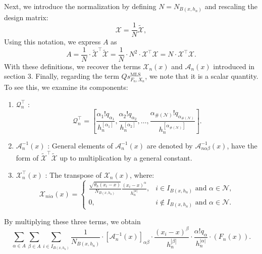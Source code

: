 \documentclass{article}
\newcommand{\mlsfunstoch}{s^\text{MLS}_{F_n,X_n}}
\begin{document}
Next, we introduce the normalization by defining $N=N_{B\left(x, h_n\right)} $ and rescaling the design matrix: 
\[
\mathscr{X} = \frac{1}{N} \tilde{\mathscr{X}},
\]
Using this notation, we express $A$ as
\[
A = \frac{1}{N} \cdot \tilde{\mathscr{X}}^\top \tilde{\mathscr{X}} = \frac{1}{N} \cdot N^2 \cdot \mathscr{X}^\top \mathscr{X}  = N \cdot \mathscr{X}^\top \mathscr{X}.
\]
With these definitions, we recover the terms $\mathscr{X}_n(x)$ and $\mathscr{A}_n(x)$  introduced in section 3. 
Finally, regarding the term $Q \mlsfunstoch$, we note that it is a scalar quantity. To see this, we examine its components:

\begin{enumerate}
    \item $\mathscr{Q}_n^{\top}$ :
 $$
\mathscr{Q}_n^{\top}=\left[\frac{\alpha_{1}!q_{\alpha_1}}{h_n^{\left[\alpha_1\right]}}, \frac{\alpha_{2}!q_{\alpha_2}}{h_n^{\left[\alpha_2\right]}}, \ldots, \frac{\alpha_{\#(\mathscr{N})}!q_{\alpha_{\#(\mathscr{N})}}}{h_n^{\left[\alpha_{\#(\mathscr{N})}\right]}}\right].
$$
   \item $\mathscr{A}_n^{-1}(x)$ :
General elements of $\mathscr{A}_n^{-1}(x)$ are denoted by $\mathscr{A}_{n\alpha \beta}^{-1}(x)$, have the form of $\tilde{\mathscr{X}}^\top \tilde{\mathscr{X}}$ up to multiplication by a general constant.\\
\item $\mathscr{X}_n^{\top}(x)$ :
The transpose of $\mathscr{X}_n(x)$, where:
$$
\mathscr{X}_{n i \alpha}(x)= \begin{cases}\frac{\sqrt{\theta_h(x_i-x)}}{N_{B\left(x, h_n\right)}} \frac{\left(x_i-x\right)^\alpha}{h_n^{|a|}}, & i \in I_{B\left(x, h_n\right)} \text { and } \alpha \in \mathscr{N}, \\ 0, &  i \notin I_{B\left(x, h_n\right)} \text { and } \alpha \in \mathscr{N}.\end{cases}
$$
\end{enumerate}
By multiplying these three terms, we obtain 
\begin{equation}
 \sum_{\alpha \in A} \sum_{\beta \in A} \sum_{ i \in I_{B\left(x, h_n\right)}} \frac{1}{ N_{B\left(x, h_n\right)}}\cdot\left[\mathscr{A}_n^{-1}(x)\right]_{\alpha \beta}\cdot \frac{\left(x_i-x\right)^\beta}{h_n^{|\beta|}} \cdot\frac{\alpha!q_\alpha}{h_n^{|\alpha|}}\cdot\left(F_n(x)\right).
\end{equation}



\end{document}
